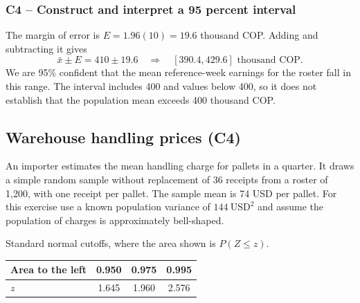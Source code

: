 
	\label{sol:c4-1-b}
	\subsubsection*{C4 -- Construct and interpret a 95 percent interval}

	The margin of error is $E=1.96(10)=19.6$ thousand COP. Adding and subtracting it gives
	\[
	\bar x\pm E=410\pm19.6
	\quad\Longrightarrow\quad [390.4,429.6]\text{ thousand COP}.
	\]
	We are 95\% confident that the mean reference-week earnings for the roster fall in this range. The interval includes 400 and values below 400, so it does not establish that the population mean exceeds 400 thousand COP.


	\clearpage

	\subsection{Warehouse handling prices (C4)}
	\label{prob:c4-2}

	\noindent
	\begin{minipage}[t]{0.53\textwidth}
	\vspace{0pt}
	An importer estimates the mean handling charge for pallets in a quarter. It draws a simple random sample without replacement of 36 receipts from a roster of 1,200, with one receipt per pallet. The sample mean is 74 USD per pallet. For this exercise use a known population variance of $144~\mathrm{USD}^2$ and assume the population of charges is approximately bell-shaped.
	\end{minipage}
	\hfill
	\begin{minipage}[t]{0.43\textwidth}
	\vspace{0pt}
	\centering\small
	Standard normal cutoffs, where the area shown is $P(Z\le z)$.\par\smallskip
	\begin{tabular}{@{}lccc@{}}
	\toprule
	Area to the left & 0.950 & 0.975 & 0.995 \\
	\midrule
	$z$ & 1.645 & 1.960 & 2.576 \\
	\bottomrule
	\end{tabular}
	\end{minipage}

